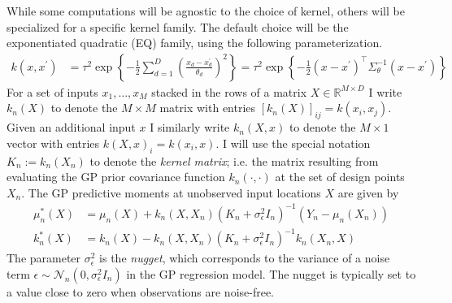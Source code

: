 \documentclass[12pt]{article}
\newcommand{\R}{\mathbb{R}}
\begin{document}
While some computations will be agnostic to the choice of kernel, others will be specialized for a specific kernel family. The default choice will be the exponentiated quadratic (EQ) family, using 
the following parameterization. 
\begin{align} 
k(x, x^\prime) &= \tau^2 \exp\left\{-\frac{1}{2} \sum_{d = 1}^{D} \left(\frac{x_d - x_d^\prime}{\theta_d}\right)^2  \right\} = \tau^2 \exp\left\{-\frac{1}{2} (x - x^\prime)^\top \Sigma_\theta^{-1}(x - x^\prime) \right\} \label{EQ_kernel}
\end{align}
For a set of inputs $x_1, \dots, x_M$ stacked in the rows of a matrix $X \in \R^{M \times D}$ I write $k_n(X)$ to denote the $M \times M$ matrix with entries $\left[k_n(X)\right]_{ij} = k(x_i, x_j)$. Given an additional input 
$x$ I similarly write $k_n(X, x)$ to denote the $M \times 1$ vector with entries $k(X, x)_i = k(x_i, x)$. I will use the special notation $K_n := k_n(X_n)$ to denote the \textit{kernel matrix}; i.e. the matrix resulting from evaluating 
the GP prior covariance function $k_n(\cdot, \cdot)$ at the set of design points $X_n$. The GP predictive moments at unobserved input locations $X$ are given by 
\begin{align*}
\mu_n^*(X) &= \mu_n(X) + k_n(X, X_n)\left(K_n + \sigma^2_{\epsilon} I_n \right)^{-1}(Y_n - \mu_n(X_n)) \\
k_n^*(X) &= k_n(X) - k_n(X, X_n) \left(K_n + \sigma^2_{\epsilon} I_n \right)^{-1} k_n(X_n, X)
\end{align*}
The parameter $\sigma^2_{\epsilon}$ is the \textit{nugget}, which corresponds to the variance of a noise term $\epsilon \sim \mathcal{N}_n(0, \sigma^2_{\epsilon} I_n)$ in the GP regression model. The nugget is typically 
set to a value close to zero when observations are noise-free. 


\end{document}
